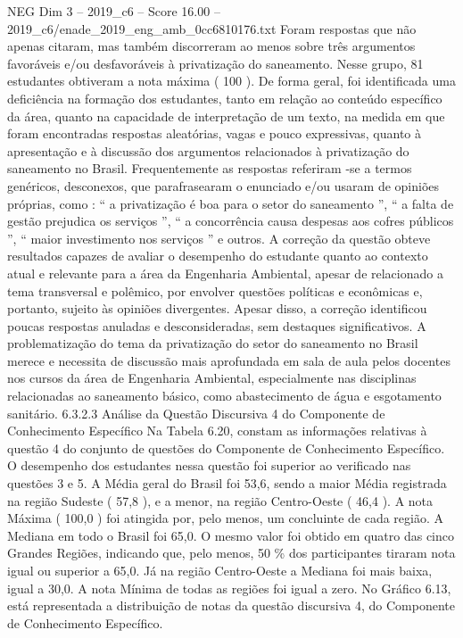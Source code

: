 \begin{textsample}{NEG Dim 3 – 2019\_c6 – Score 16.00 – 2019\_c6/enade\_2019\_eng\_amb\_0cc6810176.txt}
Foram respostas que não apenas citaram, mas também discorreram ao menos sobre três argumentos favoráveis e/ou desfavoráveis à privatização do saneamento.
Nesse grupo, 81 estudantes obtiveram a nota máxima ( 100 ).
De forma geral, foi identificada uma deficiência na formação dos estudantes, tanto em relação ao conteúdo específico da área, quanto na capacidade de interpretação de um texto, na medida em que foram encontradas respostas aleatórias, vagas e pouco expressivas, quanto à apresentação e à discussão dos argumentos relacionados à privatização do saneamento no Brasil.
Frequentemente as respostas referiram -se a termos genéricos, desconexos, que parafrasearam o enunciado e/ou usaram de opiniões próprias, como : “ a privatização é boa para o setor do saneamento ”, “ a falta de gestão prejudica os serviços ”, “ a concorrência causa despesas aos cofres públicos ”, “ maior investimento nos serviços ” e outros.
A correção da questão obteve resultados capazes de avaliar o desempenho do estudante quanto ao contexto atual e relevante para a área da Engenharia Ambiental, apesar de relacionado a tema transversal e polêmico, por envolver questões políticas e econômicas e, portanto, sujeito às opiniões divergentes.
Apesar disso, a correção identificou poucas respostas anuladas e desconsideradas, sem destaques significativos.
A problematização do tema da privatização do setor do saneamento no Brasil merece e necessita de discussão mais aprofundada em sala de aula pelos docentes nos cursos da área de Engenharia Ambiental, especialmente nas disciplinas relacionadas ao saneamento básico, como abastecimento de água e esgotamento sanitário. 6.3.2.3 Análise da Questão Discursiva 4 do Componente de Conhecimento Específico Na Tabela 6.20, constam as informações relativas à questão 4 do conjunto de questões do Componente de Conhecimento Específico.
O desempenho dos estudantes nessa questão foi superior ao verificado nas questões 3 e 5.
A Média geral do Brasil foi 53,6, sendo a maior Média registrada na região Sudeste ( 57,8 ), e a menor, na região Centro-Oeste ( 46,4 ).
A nota Máxima ( 100,0 ) foi atingida por, pelo menos, um concluinte de cada região.
A Mediana em todo o Brasil foi 65,0.
O mesmo valor foi obtido em quatro das cinco Grandes Regiões, indicando que, pelo menos, 50 \% dos participantes tiraram nota igual ou superior a 65,0.
Já na região Centro-Oeste a Mediana foi mais baixa, igual a 30,0.
A nota Mínima de todas as regiões foi igual a zero.
No Gráfico 6.13, está representada a distribuição de notas da questão discursiva 4, do Componente de Conhecimento Específico.

\end{textsample}
